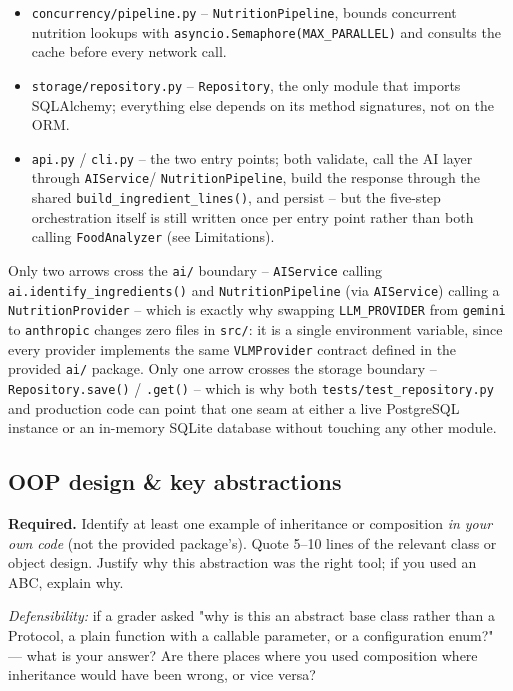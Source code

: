 \documentclass[11pt,a4paper]{article}
\newenvironment{deliverbox}{\begin{deliverboxshown}}{\end{deliverboxshown}}
\newenvironment{probebox}{\begin{probeboxshown}}{\end{probeboxshown}}
\newenvironment{deliverbox}{\setbox0\vbox\bgroup}{\egroup\ignorespacesafterend}
\newenvironment{probebox}{\setbox0\vbox\bgroup}{\egroup\ignorespacesafterend}
\begin{document}
\begin{itemize}[leftmargin=1.4em,itemsep=1pt]
  \item \texttt{concurrency/pipeline.py} -- \texttt{NutritionPipeline}, bounds concurrent nutrition lookups with \texttt{asyncio.Semaphore(MAX\_PARALLEL)} and consults the cache before every network call.
  \item \texttt{storage/repository.py} -- \texttt{Repository}, the only module that imports SQLAlchemy; everything else depends on its method signatures, not on the ORM.
  \item \texttt{api.py} / \texttt{cli.py} -- the two entry points; both validate, call the AI layer through \texttt{AIService}/
  \texttt{NutritionPipeline}, build the response through the shared \texttt{build\_ingredient\_lines()}, and persist -- but the five-step orchestration itself is still written once per entry point rather than both calling \texttt{FoodAnalyzer} (see Limitations).
\end{itemize}

\par\noindent
Only two arrows cross the \texttt{ai/} boundary -- \texttt{AIService} calling
\texttt{ai.identify\_ingredients()} and \texttt{NutritionPipeline} (via
\texttt{AIService}) calling a \texttt{NutritionProvider} -- which is exactly
why swapping \texttt{LLM\_PROVIDER} from \texttt{gemini} to
\texttt{anthropic} changes zero files in \texttt{src/}: it is a single
environment variable, since every provider implements the same
\texttt{VLMProvider} contract defined in the provided \texttt{ai/} package.
Only one arrow crosses the storage boundary -- \texttt{Repository.save()} /
\texttt{.get()} -- which is why both \texttt{tests/test\_repository.py} and
production code can point that one seam at either a live PostgreSQL
instance or an in-memory SQLite database without touching any other module.

\subsection{OOP design \& key abstractions}

\begin{deliverbox}
\textbf{Required.} Identify at least one example of inheritance or composition \emph{in your own code} (not the provided package's). Quote 5--10 lines of the relevant class or object design. Justify why this abstraction was the right tool; if you used an ABC, explain why.
\end{deliverbox}

\begin{probebox}
\textit{Defensibility:} if a grader asked "why is this an abstract base class rather than a Protocol, a plain function with a callable parameter, or a configuration enum?" --- what is your answer? Are there places where you used composition where inheritance would have been wrong, or vice versa?
\end{probebox}
\end{document}
